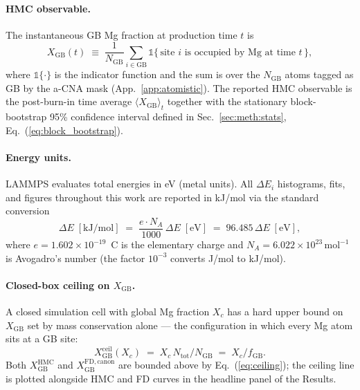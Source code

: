 
\paragraph*{HMC observable.}
The instantaneous GB Mg fraction at production time $t$ is
\begin{equation}\label{eq:Xgb_def}
X_\mathrm{GB}(t) \;\equiv\; \frac{1}{N_\mathrm{GB}}
\sum_{i \in \mathrm{GB}}
\mathbb{1}\!\big\{\, \text{site $i$ is occupied by Mg at time $t$} \,\big\} ,
\end{equation}
where $\mathbb{1}\{\cdot\}$ is the indicator function and the sum is
over the $N_\mathrm{GB}$ atoms tagged as GB by the a-CNA mask
(App.~\ref{app:atomistic}). The reported HMC observable is the
post-burn-in time average $\langle X_\mathrm{GB}\rangle_t$ together
with the stationary block-bootstrap 95\% confidence interval
defined in Sec.~\ref{sec:meth:stats}, Eq.~(\ref{eq:block_bootstrap}).



\paragraph*{Energy units.}
LAMMPS evaluates total energies in eV (metal units). All $\Delta E_i$
histograms, fits, and figures throughout this work are reported in
kJ/mol via the standard conversion
\begin{equation}\label{eq:unit_kjmol}
\Delta E \;[\mathrm{kJ/mol}]
\;=\; \frac{e \cdot N_A}{1000} \, \Delta E \;[\mathrm{eV}]
\;=\; 96.485 \, \Delta E \;[\mathrm{eV}] ,
\end{equation}
where $e = 1.602 \times 10^{-19}$~C is the elementary charge and
$N_A = 6.022 \times 10^{23}\,\mathrm{mol}^{-1}$ is Avogadro's number
(the factor $10^{-3}$ converts J/mol to kJ/mol).

\paragraph*{Closed-box ceiling on $X_\mathrm{GB}$.}
A closed simulation cell with global Mg fraction $X_c$ has a hard
upper bound on $X_\mathrm{GB}$ set by mass conservation alone — the
configuration in which every Mg atom sits at a GB site:
\begin{equation}\label{eq:ceiling}
X_\mathrm{GB}^{\mathrm{ceil}}(X_c) \;=\; X_c \, N_\mathrm{tot} / N_\mathrm{GB}
\;=\; X_c / f_\mathrm{GB} .
\end{equation}
Both $X_\mathrm{GB}^{\mathrm{HMC}}$ and $X_\mathrm{GB}^{\mathrm{FD,canon}}$
are bounded above by Eq.~(\ref{eq:ceiling}); the ceiling line is
plotted alongside HMC and FD curves in the headline panel of the
Results.


